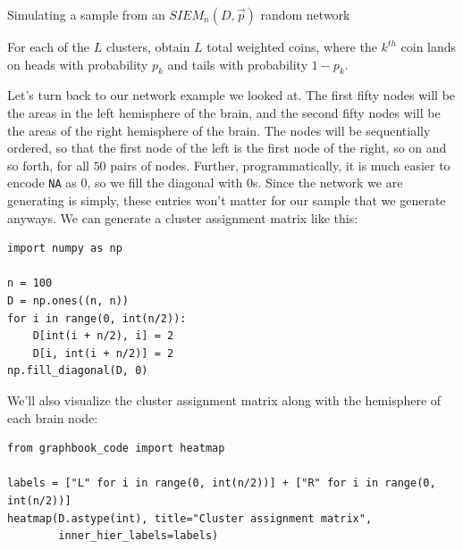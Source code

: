 \begin{algorithm}[h]\caption{Simulating a sample from an $SIEM_n(D, \vec p)$ random network}
\label{alg:ch5:siem}
\SetAlgoLined
{}

For each of the $L$ clusters, obtain $L$ total weighted coins, where the $k^{th}$ coin lands on heads with probability $p_k$ and tails with probability $1 - p_k$.


\end{algorithm}

Let's turn back to our network example we looked at. The first fifty nodes will be the areas in the left hemisphere of the brain, and the second fifty nodes will be the areas of the right hemisphere of the brain. The nodes will be sequentially ordered, so that the first node of the left is the first node of the right, so on and so forth, for all $50$ pairs of nodes. Further, programmatically, it is much easier to encode \texttt{NA} as $0$, so we fill the diagonal with $0$s. Since the network we are generating is simply, these entries won't matter for our sample that we generate anyways. We can generate a cluster assignment matrix like this:

\begin{lstlisting}[style=python]
import numpy as np

n = 100
D = np.ones((n, n))
for i in range(0, int(n/2)):
    D[int(i + n/2), i] = 2
    D[i, int(i + n/2)] = 2
np.fill_diagonal(D, 0)
\end{lstlisting}

We'll also visualize the cluster assignment matrix along with the hemisphere of each brain node:

\begin{lstlisting}[style=python]
from graphbook_code import heatmap

labels = ["L" for i in range(0, int(n/2))] + ["R" for i in range(0, int(n/2))]
heatmap(D.astype(int), title="Cluster assignment matrix", 
        inner_hier_labels=labels)
\end{lstlisting}

